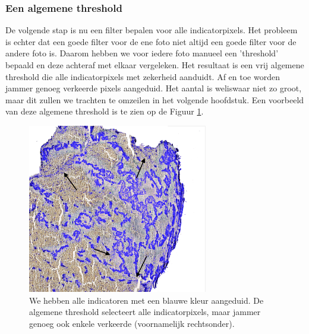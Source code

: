 \documentclass[a4paper,kulak]{kulakarticle}
\begin{document}
\subsubsection{Een algemene threshold}
De volgende stap is nu een filter bepalen voor alle indicatorpixels. Het probleem is echter dat een goede filter voor de ene foto niet altijd een goede filter voor de andere foto is. Daarom hebben we voor iedere foto manueel een 'threshold' bepaald en deze achteraf met elkaar vergeleken. Het resultaat is een vrij algemene threshold die alle indicatorpixels met zekerheid aanduidt. Af en toe worden jammer genoeg verkeerde pixels aangeduid. Het aantal is weliswaar niet zo groot, maar dit zullen we trachten te omzeilen in het volgende hoofdstuk. Een voorbeeld van deze algemene threshold is te zien op de Figuur \ref{figuur alg_tresh}.
\begin{figure}[H]
	\centering
	\includegraphics[width = 0.7\textwidth]{algemene_threshold}
	
	\caption{We hebben alle indicatoren met een blauwe kleur aangeduid. De algemene threshold selecteert alle indicatorpixels, maar jammer genoeg ook enkele verkeerde (voornamelijk rechtsonder).}
	\label{figuur alg_tresh}
\end{figure}
\end{document}
